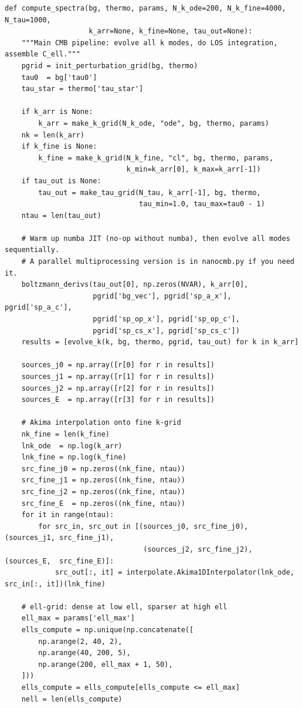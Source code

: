 \begin{codebox}
\begin{lstlisting}[style=python]
def compute_spectra(bg, thermo, params, N_k_ode=200, N_k_fine=4000, N_tau=1000,
                    k_arr=None, k_fine=None, tau_out=None):
    """Main CMB pipeline: evolve all k modes, do LOS integration, assemble C_ell."""
    pgrid = init_perturbation_grid(bg, thermo)
    tau0  = bg['tau0']
    tau_star = thermo['tau_star']

    if k_arr is None:
        k_arr = make_k_grid(N_k_ode, "ode", bg, thermo, params)
    nk = len(k_arr)
    if k_fine is None:
        k_fine = make_k_grid(N_k_fine, "cl", bg, thermo, params,
                             k_min=k_arr[0], k_max=k_arr[-1])
    if tau_out is None:
        tau_out = make_tau_grid(N_tau, k_arr[-1], bg, thermo,
                                tau_min=1.0, tau_max=tau0 - 1)
    ntau = len(tau_out)

    # Warm up numba JIT (no-op without numba), then evolve all modes sequentially.
    # A parallel multiprocessing version is in nanocmb.py if you need it.
    boltzmann_derivs(tau_out[0], np.zeros(NVAR), k_arr[0],
                     pgrid['bg_vec'], pgrid['sp_a_x'], pgrid['sp_a_c'],
                     pgrid['sp_op_x'], pgrid['sp_op_c'],
                     pgrid['sp_cs_x'], pgrid['sp_cs_c'])
    results = [evolve_k(k, bg, thermo, pgrid, tau_out) for k in k_arr]

    sources_j0 = np.array([r[0] for r in results])
    sources_j1 = np.array([r[1] for r in results])
    sources_j2 = np.array([r[2] for r in results])
    sources_E  = np.array([r[3] for r in results])

    # Akima interpolation onto fine k-grid
    nk_fine = len(k_fine)
    lnk_ode  = np.log(k_arr)
    lnk_fine = np.log(k_fine)
    src_fine_j0 = np.zeros((nk_fine, ntau))
    src_fine_j1 = np.zeros((nk_fine, ntau))
    src_fine_j2 = np.zeros((nk_fine, ntau))
    src_fine_E  = np.zeros((nk_fine, ntau))
    for it in range(ntau):
        for src_in, src_out in [(sources_j0, src_fine_j0), (sources_j1, src_fine_j1),
                                 (sources_j2, src_fine_j2), (sources_E,  src_fine_E)]:
            src_out[:, it] = interpolate.Akima1DInterpolator(lnk_ode, src_in[:, it])(lnk_fine)

    # ell-grid: dense at low ell, sparser at high ell
    ell_max = params['ell_max']
    ells_compute = np.unique(np.concatenate([
        np.arange(2, 40, 2),
        np.arange(40, 200, 5),
        np.arange(200, ell_max + 1, 50),
    ]))
    ells_compute = ells_compute[ells_compute <= ell_max]
    nell = len(ells_compute)


\end{lstlisting}
\end{codebox}
